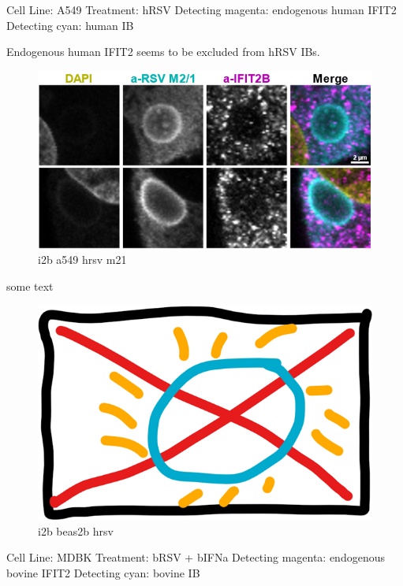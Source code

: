 Cell Line: A549 \newline
Treatment: hRSV \newline
Detecting magenta: endogenous human IFIT2  \newline
Detecting cyan: human IB \newline

Endogenous human IFIT2 seems to be excluded from hRSV IBs.

\begin{figure}
    \centering
    \includegraphics[width=1\linewidth]{10. Chapter 5//Figs//02. I2B/05. i2b a549 hrsv m21.png}
    \caption[i2b a549 hrsv m21]{i2b a549 hrsv m21}
    \label{fig:i2b a549 hrsv m21}
\end{figure}

some text

\begin{figure}
    \centering
    \includegraphics[width=0.5\linewidth]{10. Chapter 5//Figs//02. I2B/00. placeholder.png}
    \caption[i2b beas2b hrsv]{i2b beas2b hrsv}
    \label{fig:i2b beas2b hrsv}
\end{figure}

Cell Line: MDBK \newline
Treatment: bRSV + bIFNa \newline
Detecting magenta: endogenous bovine IFIT2  \newline
Detecting cyan: bovine IB \newline

